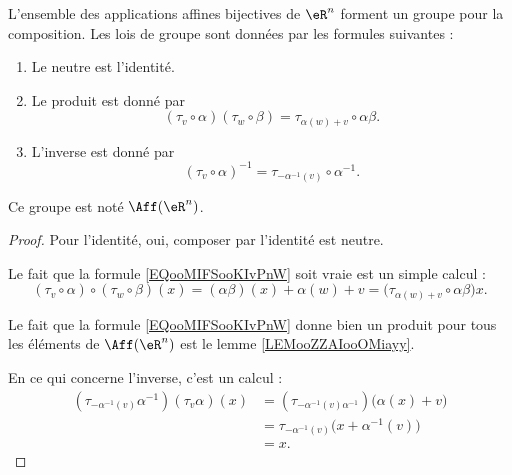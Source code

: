 \begin{propositionDef}      \label{PROPooBPKKooJRAMeT} \label{LEMooUBGZooBIlmAN}
    L'ensemble des applications affines bijectives de \( \eR^n\) forment un groupe pour la composition. Les lois de groupe sont données par les formules suivantes :
    \begin{enumerate}
        \item
            Le neutre est l'identité.
        \item       \label{ITEMooGUFRooMuhXds}
            Le produit est donné par
            \begin{equation}        \label{EQooMIFSooKIvPnW}
                (\tau_v\circ \alpha)(\tau_w\circ \beta)=\tau_{\alpha(w)+v}\circ \alpha\beta.
            \end{equation}
        \item       \label{ITEMooYOMSooRUDSdm}
            L'inverse est donné par
            \begin{equation}
                (\tau_v\circ\alpha)^{-1}=\tau_{-\alpha^{-1}(v)}\circ \alpha^{-1}.
            \end{equation}
    \end{enumerate}
    Ce groupe est noté \( \Aff(\eR^n)\).
\end{propositionDef}

\begin{proof}
    Pour l'identité, oui, composer par l'identité est neutre.

    Le fait que la formule \eqref{EQooMIFSooKIvPnW} soit vraie est un simple calcul :
    \begin{equation}
        (\tau_v\circ\alpha)\circ(\tau_w\circ\beta)(x)=(\alpha\beta)(x)+\alpha(w)+v=\big( \tau_{\alpha(w)+v}\circ \alpha\beta\big)x.
    \end{equation}

    Le fait que la formule \eqref{EQooMIFSooKIvPnW} donne bien un produit pour tous les éléments de \( \Aff(\eR^n)\) est le lemme \ref{LEMooZZAIooOMiayy}.

    En ce qui concerne l'inverse, c'est un calcul :
    \begin{subequations}
        \begin{align}
            (\tau_{-\alpha^{-1}(v)}\alpha^{-1})(\tau_v\alpha)(x)&=(\tau_{-\alpha^{-1}(v)\alpha^{-1}})\big( \alpha(x)+v \big)\\
            &=\tau_{-\alpha^{-1}(v)}\big( x+\alpha^{-1}(v) \big)\\
            &=x.
        \end{align}
    \end{subequations}
\end{proof}

